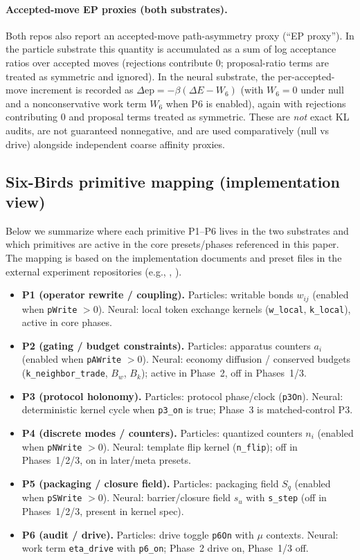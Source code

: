 \documentclass[11pt]{article}
\begin{document}
\paragraph{Accepted-move EP proxies (both substrates).}
Both repos also report an accepted-move path-asymmetry proxy (``EP proxy''). In the particle substrate this quantity is accumulated as a sum of log acceptance ratios over accepted moves (rejections contribute $0$; proposal-ratio terms are treated as symmetric and ignored). In the neural substrate, the per-accepted-move increment is recorded as $\Delta\mathrm{ep}=-\beta(\Delta E - W_6)$ (with $W_6=0$ under null and a nonconservative work term $W_6$ when P6 is enabled), again with rejections contributing $0$ and proposal terms treated as symmetric. These are \emph{not} exact KL audits, are not guaranteed nonnegative, and are used comparatively (null vs drive) alongside independent coarse affinity proxies.

\subsection{Six-Birds primitive mapping (implementation view)}\label{sec:inst:primitives}
Below we summarize where each primitive P1--P6 lives in the two substrates and which primitives are active in the core presets/phases referenced in this paper. The mapping is based on the implementation documents and preset files in the external experiment repositories (e.g., , ).
\begin{itemize}[leftmargin=*]
\item \textbf{P1 (operator rewrite / coupling).} Particles: writable bonds $w_{ij}$ (enabled when \texttt{pWrite} $>0$). Neural: local token exchange kernels (\texttt{w\_local}, \texttt{k\_local}), active in core phases.
\item \textbf{P2 (gating / budget constraints).} Particles: apparatus counters $a_i$ (enabled when \texttt{pAWrite} $>0$). Neural: economy diffusion / conserved budgets (\texttt{k\_neighbor\_trade}, $B_w$, $B_k$); active in Phase~2, off in Phases~1/3.
\item \textbf{P3 (protocol holonomy).} Particles: protocol phase/clock (\texttt{p3On}). Neural: deterministic kernel cycle when \texttt{p3\_on} is true; Phase~3 is matched-control P3.
\item \textbf{P4 (discrete modes / counters).} Particles: quantized counters $n_i$ (enabled when \texttt{pNWrite} $>0$). Neural: template flip kernel (\texttt{n\_flip}); off in Phases~1/2/3, on in later/meta presets.
\item \textbf{P5 (packaging / closure field).} Particles: packaging field $S_q$ (enabled when \texttt{pSWrite} $>0$). Neural: barrier/closure field $s_u$ with \texttt{s\_step} (off in Phases~1/2/3, present in kernel spec).
\item \textbf{P6 (audit / drive).} Particles: drive toggle \texttt{p6On} with $\mu$ contexts. Neural: work term \texttt{eta\_drive} with \texttt{p6\_on}; Phase~2 drive on, Phase~1/3 off.
\end{itemize}
\end{document}
